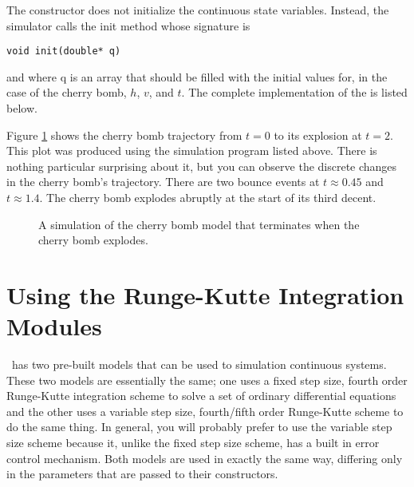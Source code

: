 The constructor does not initialize the continuous state variables. Instead, the simulator calls the init method whose signature is
\begin{verbatim}
void init(double* q)
\end{verbatim}
and where q is an array that should be filled with the initial values for, in the case of the cherry bomb, $h$, $v$, and $t$. The complete implementation of the  is listed below.

Figure \ref{fig:cherry_bomb_trajectory} shows the cherry bomb trajectory from $t=0$ to its explosion at $t=2$. This plot was produced using the simulation program listed above. There is nothing particular surprising about it, but you can observe the discrete changes in the cherry bomb's trajectory. There are two bounce events at $t \approx 0.45$ and $t \approx 1.4$. The cherry bomb explodes abruptly at the start of its third decent.
\begin{figure}[ht]
\centering
{}
\caption{A simulation of the cherry bomb model that terminates when the cherry bomb explodes.}
\label{fig:cherry_bomb_trajectory}
\end{figure}
\section{Using the Runge-Kutte Integration Modules}
\adevs\ has two pre-built  models that can be used to simulation continuous systems. These two models are essentially the same; one uses a fixed step size, fourth order Runge-Kutte integration scheme to solve a set of ordinary differential equations and the other uses a variable step size, fourth/fifth order Runge-Kutte scheme to do the same thing. In general, you will probably prefer to use the variable step size scheme because it, unlike the fixed step size scheme, has a built in error control mechanism. Both models are used in exactly the same way, differing only in the parameters that are passed to their constructors.

